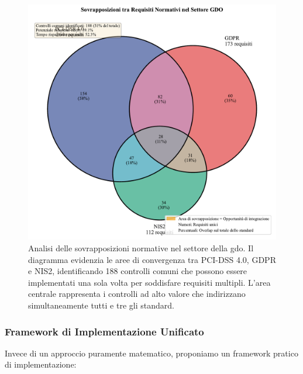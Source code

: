 \begin{figure}[htbp]
\centering
\includegraphics[width=1\textwidth]{thesis_figures/cap4/figura_4_1_venn_normative.pdf}
\caption{Analisi delle sovrapposizioni normative nel settore della \gls{gdo}. Il diagramma evidenzia le aree di convergenza tra PCI-DSS 4.0, GDPR e NIS2, identificando 188 controlli comuni che possono essere implementati una sola volta per soddisfare requisiti multipli. L'area centrale rappresenta i controlli ad alto valore che indirizzano simultaneamente tutti e tre gli standard.}
\label{fig:venn_normative}
\end{figure}

\subsubsection{Framework di Implementazione Unificato}

Invece di un approccio puramente matematico, proponiamo un framework pratico di implementazione:

